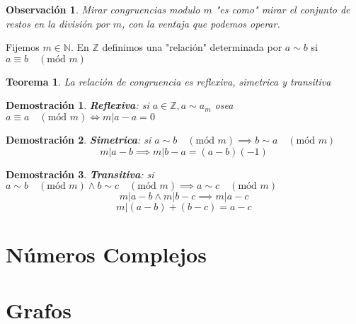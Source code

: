 \documentclass[9pt,a4paper,draft]{article}
\theoremstyle{definition}
\theoremstyle{plain}
\newtheorem{teo}{Teorema}
\newtheorem{demo}{Demostración}[teo]
\newtheorem{obs}{Observación}
\newcommand{\modu}[1]{\quad(\text{mód }#1)}
\begin{document}
\begin{obs}
Mirar congruencias modulo $m$ "es como" mirar el conjunto de restos en la división por $m$, con la ventaja que podemos operar.
\end{obs}

Fijemos $m\in{\mathbb{N}}$. En $\mathbb{Z}$ definimos una "relación" determinada por $a\sim b$ si $a\equiv b \modu{m}$

\begin{teo} La relación de congruencia es reflexiva, simetrica y transitiva\end{teo}

\begin{demo}
{\bfseries Reflexiva}: si $a\in{\mathbb{Z}}, a\sim a_m$ osea $a\equiv a\modu{m} \iff m|a-a = 0$ 
\end{demo}

\begin{demo}
{\bfseries Simetrica}: si $a\sim b\modu{m} \implies b\sim a\modu{m}$
$$ m|a-b \implies m|b-a = (a-b)(-1)$$
\end{demo}

\begin{demo}
{\bfseries Transitiva}: si $a\sim b\modu{m} \land b\sim c\modu{m} \implies a\sim c\modu{m}$
$$m|a-b \land m|b-c \implies m|a-c$$
$$m|(a-b)+(b-c) = a-c$$
\end{demo}

\part{Números Complejos}

\part{Grafos}
\end{document}
